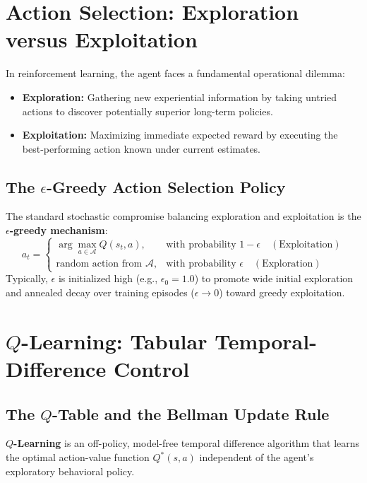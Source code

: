 \section{Action Selection: Exploration versus Exploitation}

In reinforcement learning, the agent faces a fundamental operational dilemma:
\begin{itemize}
    \item \textbf{Exploration:} Gathering new experiential information by taking untried actions to discover potentially superior long-term policies.
    \item \textbf{Exploitation:} Maximizing immediate expected reward by executing the best-performing action known under current estimates.
\end{itemize}

\subsection{The \texorpdfstring{$\epsilon$-Greedy}{epsilon-Greedy} Action Selection Policy}
The standard stochastic compromise balancing exploration and exploitation is the \textbf{$\epsilon$-greedy mechanism}:
\begin{equation}
    a_t = \begin{cases}
    \arg\max_{a \in \mathcal{A}} Q(s_t, a), & \text{with probability } 1 - \epsilon \quad (\text{Exploitation}) \\
    \text{random action from } \mathcal{A}, & \text{with probability } \epsilon \quad (\text{Exploration})
    \end{cases}
\end{equation}
Typically, $\epsilon$ is initialized high (e.g., $\epsilon_0 = 1.0$) to promote wide initial exploration and annealed decay over training episodes ($\epsilon \to 0$) toward greedy exploitation.

\section{\texorpdfstring{$Q$-Learning}{Q-Learning}: Tabular Temporal-Difference Control}

\subsection{The \texorpdfstring{$Q$-Table}{Q-Table} and the Bellman Update Rule}
\textbf{$Q$-Learning} is an off-policy, model-free temporal difference algorithm that learns the optimal action-value function $Q^*(s, a)$ independent of the agent's exploratory behavioral policy.


